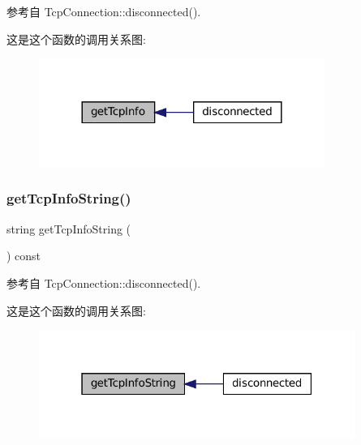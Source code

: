 参考自 Tcp\+Connection\+::disconnected().

这是这个函数的调用关系图\+:
\nopagebreak
\begin{figure}[H]
\begin{center}
\leavevmode
\includegraphics[width=264pt]{classmuduo_1_1net_1_1TcpConnection_a1de4ddf8b40138039f3382ec9c4a0366_icgraph}
\end{center}
\end{figure}
\mbox{\label{classmuduo_1_1net_1_1TcpConnection_a60514adf97e4a2d28f74ff39a5275bde}} 
\subsubsection{\texorpdfstring{get\+Tcp\+Info\+String()}{getTcpInfoString()}}
{\footnotesize\ttfamily string get\+Tcp\+Info\+String (\begin{DoxyParamCaption}{ }\end{DoxyParamCaption}) const}



参考自 Tcp\+Connection\+::disconnected().

这是这个函数的调用关系图\+:
\nopagebreak
\begin{figure}[H]
\begin{center}
\leavevmode
\includegraphics[width=292pt]{classmuduo_1_1net_1_1TcpConnection_a60514adf97e4a2d28f74ff39a5275bde_icgraph}
\end{center}
\end{figure}
\mbox{\label{classmuduo_1_1net_1_1TcpConnection_a2cb2baff35786f9caa991e3c47908d91}} 
